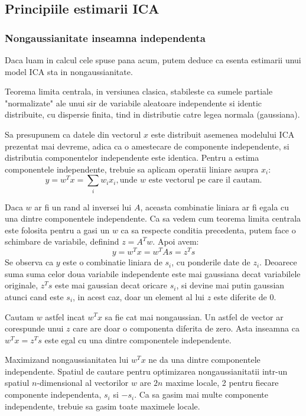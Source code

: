\documentclass[12pt,oneside]{article}
\begin{document}
 \subsection{Principiile estimarii ICA}
 \subsubsection{Nongaussianitate inseamna independenta}
 Daca luam in calcul cele spuse pana acum, putem deduce ca esenta estimarii unui model ICA sta in nongaussianitate.

 Teorema limita centrala, in versiunea clasica, stabileste ca sumele partiale "normalizate" ale unui sir de variabile aleatoare independente si identic distribuite, cu dispersie finita, tind in distributie catre legea normala (gaussiana).\cite{paltanea}

 Sa presupunem ca datele din vectorul $x$ este distribuit asemenea modelului ICA prezentat mai devreme, adica ca o amestecare de componente independente, si distributia componentelor independente este  identica. Pentru a estima componentele independente, trebuie sa aplicam operatii liniare asupra $x_i$:
 \begin{equation}
	y=w^Tx=\sum_{i}w_ix_i, \text{unde $w$ este vectorul pe care il cautam.}
 \end{equation}

 Daca $w$ ar fi un rand al inversei lui $A$, aceasta combinatie liniara ar fi egala cu una dintre componentele independente. Ca sa vedem cum teorema limita centrala este folosita pentru a gasi un $w$ ca sa respecte conditia precedenta, putem face o schimbare de variabile, definind $z=A^Tw$. Apoi avem:
 \begin{equation}
	 y=w^Tx=w^TAs=z^Ts
 \end{equation}
 Se observa ca $y$ este o combinatie liniara de $s_i$, cu ponderile date de $z_i$. Deoarece suma suma celor doua variabile independente este mai gaussiana decat variabilele originale, $z^Ts$ este mai gaussian decat oricare $s_i$, si devine mai putin gaussian atunci cand este $s_i$, in acest caz, doar un element al lui $z$ este diferite de 0. 
 
 Cautam $w$ astfel incat $w^Tx$ sa fie cat mai nongaussian. Un astfel de vector ar corespunde unui $z$ care are doar o componenta diferita de zero. Asta inseamna ca $w^Tx=z^Ts$ este egal cu una dintre componentele independente.

 Maximizand nongaussianitatea lui $w^Tx$ ne da una dintre componentele independente. Spatiul de cautare pentru optimizarea nongaussianitatii intr-un spatiul $n$-dimensional al vectorilor $w$ are $2n$ maxime locale, 2 pentru fiecare componente independenta, $s_i$ si $-s_i$. Ca sa gasim mai multe componente independente, trebuie sa gasim toate maximele locale.  
\newpage
\end{document}
